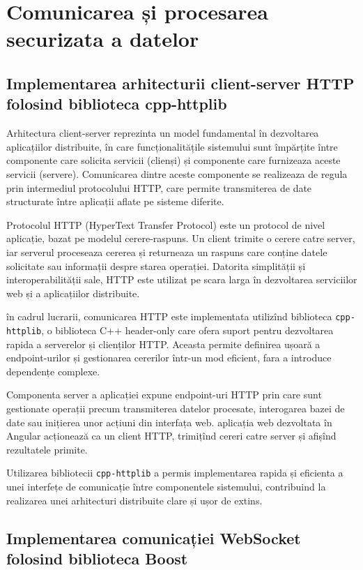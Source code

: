 \section{Comunicarea și procesarea securizata a datelor}

\subsection*{Implementarea arhitecturii client-server HTTP folosind biblioteca cpp-httplib}

Arhitectura client-server reprezinta un model fundamental în dezvoltarea aplicațiilor distribuite, în care funcționalitățile sistemului sunt împărțite între componente care solicita servicii (clienși) și componente care furnizeaza aceste servicii (servere). Comunicarea dintre aceste componente se realizeaza de regula prin intermediul protocolului HTTP, care permite transmiterea de date structurate între aplicații aflate pe sisteme diferite.

Protocolul HTTP (HyperText Transfer Protocol) este un protocol de nivel aplicație, bazat pe modelul cerere-raspuns. Un client trimite o cerere catre server, iar serverul proceseaza cererea și returneaza un raspuns care conține datele solicitate sau informații despre starea operației. Datorita simplității și interoperabilității sale, HTTP este utilizat pe scara larga în dezvoltarea serviciilor web și a aplicațiilor distribuite.

în cadrul lucrarii, comunicarea HTTP este implementata utilizînd biblioteca \texttt{cpp-httplib}, o biblioteca C++ header-only care ofera suport pentru dezvoltarea rapida a serverelor și clienților HTTP. Aceasta permite definirea ușoară a endpoint-urilor și gestionarea cererilor într-un mod eficient, fara a introduce dependențe complexe.

Componenta server a aplicației expune endpoint-uri HTTP prin care sunt gestionate operații precum transmiterea datelor procesate, interogarea bazei de date sau inițierea unor acțiuni din interfața web. aplicația web dezvoltata în Angular acționează ca un client HTTP, trimițînd cereri catre server și afișînd rezultatele primite.

Utilizarea bibliotecii \texttt{cpp-httplib} a permis implementarea rapida și eficienta a unei interfețe de comunicație între componentele sistemului, contribuind la realizarea unei arhitecturi distribuite clare și ușor de extins.

\subsection*{Implementarea comunicației WebSocket folosind biblioteca Boost}

